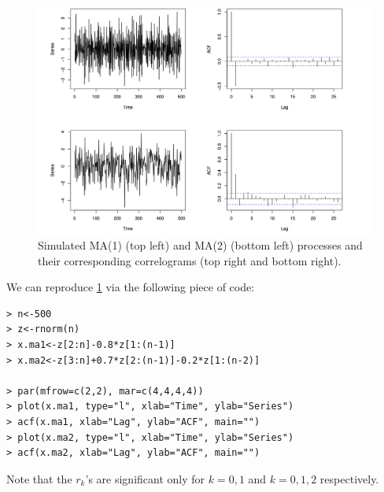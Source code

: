 \begin{figure}[ht]
	\centering
	\includegraphics[width=\textwidth]{Chapter 3/fig3-3.png}
	\caption{Simulated MA(1) (top left) and MA(2) (bottom left) processes and their corresponding correlograms 
	(top right and bottom right).}
	\label{fig:3.3}
\end{figure}

We can reproduce \cref{fig:3.3} via the following piece of code:
\begin{verbatim}
> n<-500
> z<-rnorm(n)
> x.ma1<-z[2:n]-0.8*z[1:(n-1)]
> x.ma2<-z[3:n]+0.7*z[2:(n-1)]-0.2*z[1:(n-2)]

> par(mfrow=c(2,2), mar=c(4,4,4,4))
> plot(x.ma1, type="l", xlab="Time", ylab="Series")
> acf(x.ma1, xlab="Lag", ylab="ACF", main="")
> plot(x.ma2, type="l", xlab="Time", ylab="Series")
> acf(x.ma2, xlab="Lag", ylab="ACF", main="")
\end{verbatim}

Note that the $r_k$'s are significant only for $k = 0,1$ and $k = 0,1,2$ respectively.


